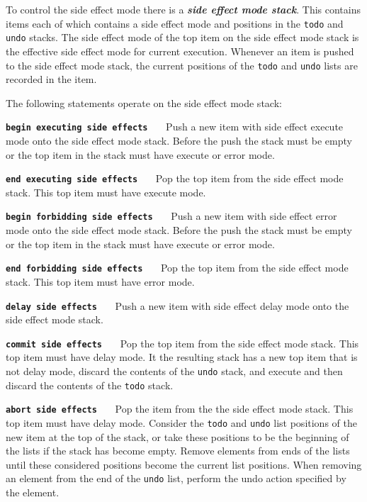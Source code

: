 \documentclass[12pt]{article}
\makeatletter
\newcommand{\key}[1]{{\bf \em #1}\index{#1}}
\newcommand{\ttkey}[1]{{\tt \bf #1}\index{#1@{\tt #1}}}
\makeatother
\begin{document}
To control the side effect mode there is a \key{side effect mode stack}.
This contains items each of which contains a side effect mode and
positions in the {\tt todo} and {\tt undo} stacks.  The side effect mode
of the top item on the side effect mode stack is the effective side
effect mode for current execution.
Whenever an item is pushed to the side effect mode stack, the current
positions of the {\tt todo} and {\tt undo} lists are recorded in the
item.

The following statements operate on the side effect mode stack:

\begin{list}{}{}
\item[\ttkey{begin executing side effects}]~~~Push a new item with side effect
execute mode onto the side effect mode stack.  Before the push the
stack must be empty or the top item in the stack must have execute or
error mode.

\item[\ttkey{end executing side effects}]~~~Pop the top item from
the side effect mode stack.  This top item must have
execute mode.

\item[\ttkey{begin forbidding side effects}]~~~Push a new item with side effect
error mode onto the side effect mode stack.  Before the push the
stack must be empty or the top item in the stack must have execute or
error mode.

\item[\ttkey{end forbidding side effects}]~~~Pop the top item from the
side effect mode stack.  This top item must have
error mode.

\item[\ttkey{delay side effects}]~~~Push a new item with side effect
delay mode onto the side effect mode stack.

\item[\ttkey{commit side effects}]~~~Pop the top item from the
side effect mode stack.  This top item must have
delay mode.  It the resulting stack has a new top item that is not
delay mode, discard the contents of the {\tt undo} stack, and execute
and then discard the contents of the {\tt todo} stack.

\item[\ttkey{abort side effects}]~~~Pop the item from the
the side effect mode stack.  This top item must have
delay mode.  Consider the {\tt todo} and {\tt undo} list positions
of the new item at the top of the stack, or take these positions to be
the beginning of the lists if the stack has become empty.  Remove
elements from ends of the lists until these considered positions become
the current list positions.  When removing an element from the end of the
{\tt undo} list, perform the undo action specified by the element.

\end{list}
\end{document}
